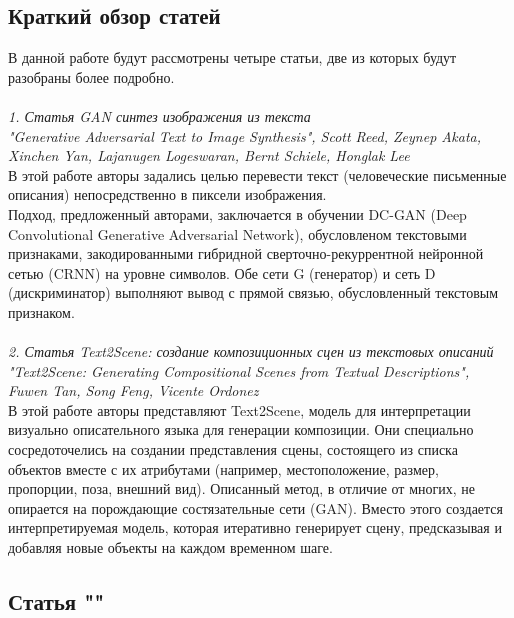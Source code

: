 \documentclass{article}
\begin{document}
    \newpage
    \begin{center} 
    \section{Краткий обзор статей}
    \end{center}
    \large 
    В данной работе будут рассмотрены четыре статьи, две из которых будут разобраны более подробно.
    \\ \\
    \textit{1. Статья GAN синтез изображения из текста
    \\
    "Generative Adversarial Text to Image Synthesis", Scott Reed, Zeynep Akata, Xinchen Yan, Lajanugen Logeswaran, Bernt Schiele, Honglak Lee}
    \\

    В этой работе авторы задались целью перевести текст (человеческие письменные описания) непосредственно в пиксели изображения.
    \\
    Подход, предложенный авторами, заключается в обучении DC-GAN (Deep Convolutional Generative Adversarial Network), обусловленом текстовыми признаками, закодированными гибридной сверточно-рекуррентной нейронной сетью (CRNN) на уровне символов. Обе сети G (генератор) и сеть D (дискриминатор) выполняют вывод с прямой связью, обусловленный текстовым признаком.
    \\ \\
    \textit{2. Статья Text2Scene: создание композиционных сцен из текстовых описаний
    \\
    "Text2Scene: Generating Compositional Scenes from Textual Descriptions", Fuwen Tan, Song Feng, Vicente Ordonez}
    \\

    В этой работе авторы представляют Text2Scene, модель для интерпретации визуально описательного языка для генерации композиции. Они специально сосредоточелись на создании представления сцены, состоящего из списка объектов вместе с их атрибутами (например, местоположение, размер, пропорции, поза, внешний вид). Описанный метод, в отличие от многих, не опирается на порождающие состязательные сети (GAN). Вместо этого создается интерпретируемая модель, которая итеративно генерирует сцену, предсказывая и добавляя новые объекты на каждом временном шаге.
    
    \newpage
    \begin{center} 
    \section{Статья ""}
    \end{center} 
    
\end{document}
